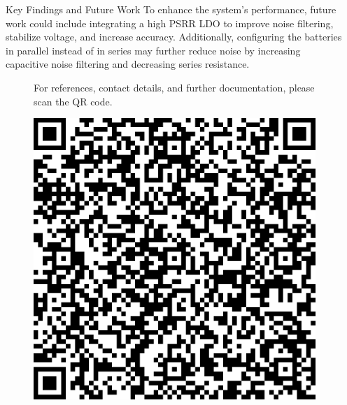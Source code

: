 \documentclass[final]{beamer}
\newlength{\sepwidth}
\newlength{\colwidth}
\newcommand{\separatorcolumn}{\begin{column}{\sepwidth}
\end{column}}
\begin{document}
\begin{frame}[t]
\begin{columns}[t]
\begin{column}{\colwidth}
\begin{block}{Key Findings and Future Work}
					To enhance the system's performance, future work could include
					integrating a high PSRR LDO to improve noise filtering, stabilize voltage,
					and increase accuracy. Additionally, configuring the batteries in
					parallel instead of in series may further reduce noise by increasing
					capacitive noise filtering and decreasing series resistance.
				\end{block}

				\begin{figure}
					\begin{flushright}
						\begin{minipage}{1\textwidth}
							\begin{minipage}{0.7\textwidth}
								\raggedright For references, contact details, and further documentation,
								please scan the QR code.
							\end{minipage}
							\hfill
							\begin{minipage}{0.10\textwidth}
								\includegraphics[width=\linewidth]{qrcode.png}
							\end{minipage}
						\end{minipage}
					\end{flushright}
				\end{figure}
			\end{column}

			\separatorcolumn
		\end{columns}
	\end{frame}
\end{document}
